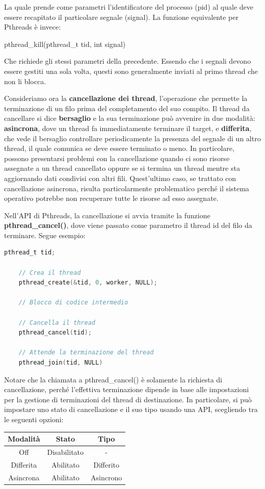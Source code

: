\noindent La quale prende come parametri l'identificatore del processo (pid) al quale deve essere recapitato il particolare segnale (signal). La
funzione equivalente per Pthreads è invece: \begin{center}
	pthread\_kill(pthread\_t tid, int signal)
\end{center}
\noindent Che richiede gli stessi parametri della precedente. Essendo che i segnali devono essere gestiti una sola volta, questi sono generalmente
inviati al primo thread che non li blocca.\par
Consideriamo ora la \textbf{cancellazione dei thread}, l'operazione che permette la terminazione di un filo prima del completamento del suo compito.
Il thread da cancellare si dice \textbf{bersaglio} e la sua terminazione può avvenire in due modalità: \textbf{asincrona}, dove un thread fa
immediatamente terminare il target, e \textbf{differita}, che vede il bersaglio controllare periodicamente la presenza del segnale di un altro thread,
il quale comunica se deve essere terminato o meno. In particolare, possono presentarsi problemi con la cancellazione quando ci sono risorse assegnate
a un thread cancellato oppure se si termina un thread mentre sta aggiornando dati condivisi con altri fili. Quest'ultimo caso, se trattato con 
cancellazione asincrona, risulta particolarmente problematico perché il sistema operativo potrebbe non recuperare tutte le risorse ad esso assegnate.\par
Nell'API di Pthreads, la cancellazione si avvia tramite la funzione \textbf{pthread\_cancel()}, dove viene passato come parametro il thread id del filo
da terminare. Segue esempio: \begin{lstlisting}[language=C]
	pthread_t tid;
	
	// Crea il thread
	pthread_create(&tid, 0, worker, NULL);

	// Blocco di codice intermedio

	// Cancella il thread
	pthread_cancel(tid);

	// Attende la terminazione del thread
	pthread_join(tid, NULL)
\end{lstlisting}

\noindent Notare che la chiamata a pthread\_cancel() è solamente la richiesta di cancellazione, perché l'effettiva terminazione dipende in base
alle impostazioni per la gestione di terminazioni del thread di destinazione. In particolare, si può impostare uno stato di cancellazione e il suo tipo
usando una API, scegliendo tra le seguenti opzioni: \begin{table}[h]
	\centering
	\begin{tabular}{|c|c|c|}
		\hline
		\textbf{Modalità} & \textbf{Stato} & \textbf{Tipo}\\
		\hline
		Off & Disabilitato & -\\
		\hline
		Differita & Abilitato & Differito\\
		\hline
		Asincrona & Abilitato & Asincrono\\
		\hline
	\end{tabular}
\end{table}

